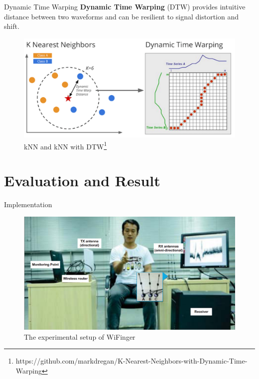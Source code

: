 \documentclass{beamer}
\begin{document}
\begin{frame}{Dynamic Time Warping}
	\textbf{Dynamic Time Warping} (DTW) provides intuitive distance between two waveforms and can 	be resilient to signal distortion and shift.
	\begin{figure}
		\includegraphics[width=0.75\linewidth]{Images/dtw-1.png}
		\caption{kNN and kNN with DTW\footnote{https://github.com/markdregan/K-Nearest-Neighbors-with-Dynamic-Time-Warping}}
	\end{figure}
\end{frame}





\section{Evaluation and Result}
\begin{frame}{Implementation}
	\begin{center}
		\begin{figure}
			\includegraphics[width=1.\textwidth]{Images/impl.png}
			\caption{The experimental setup of WiFinger~\cite{li2016wifinger}}
		\end{figure}
    \end{center}
\end{frame}
\end{document}
